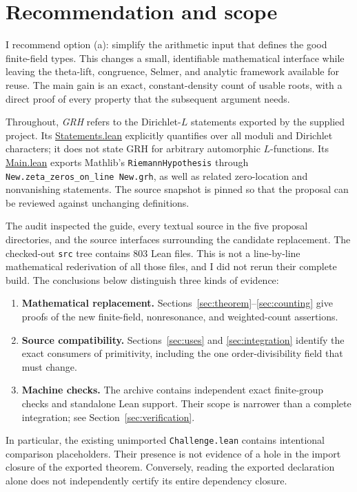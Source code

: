 \documentclass[11pt,a4paper]{article}
\theoremstyle{definition}
\theoremstyle{remark}
\newcommand{\code}[1]{{\small\nolinkurl{#1}}}
\newcommand{\src}[2]{\href{https://github.com/VladimirReshetnikov/ProveIt/blob/89d12dd40424f1217fd818d84877b3da52396a3b/Analysis/GeneralizedRiemannHypothesis/Lean/grh/src/#1.lean}{#2}}
\begin{document}
\section{Recommendation and scope}

I recommend option (a): simplify the arithmetic input that defines the good finite-field
types. This changes a small, identifiable mathematical interface while leaving the
theta-lift, congruence, Selmer, and analytic framework available for reuse.
The main gain is an exact, constant-density count of usable roots, with a direct proof of
every property that the subsequent argument needs.

Throughout, \emph{GRH} refers to the Dirichlet-\(L\) statements exported by the supplied
project. Its \src{Statements}{Statements.lean} explicitly quantifies over all moduli and
Dirichlet characters; it does not state GRH for arbitrary automorphic \(L\)-functions.
Its \src{Main}{Main.lean} exports Mathlib's \code{RiemannHypothesis} through
\code{New.zeta_zeros_on_line New.grh}, as well as related zero-location and nonvanishing
statements. The source snapshot is pinned so that the proposal can be reviewed against
unchanging definitions.

The audit inspected the guide, every textual source in the five proposal directories,
and the source interfaces surrounding the candidate replacement. The checked-out
\code{src} tree contains 803 Lean files. This is not a line-by-line mathematical
rederivation of all those files, and I did not rerun their complete build.
The conclusions below distinguish three kinds of evidence:

\begin{enumerate}
\item \textbf{Mathematical replacement.} Sections~\ref{sec:theorem}--\ref{sec:counting}
give proofs of the new finite-field, nonresonance, and weighted-count assertions.
\item \textbf{Source compatibility.} Sections~\ref{sec:uses} and \ref{sec:integration}
identify the exact consumers of primitivity, including the one order-divisibility
field that must change.
\item \textbf{Machine checks.} The archive contains independent exact finite-group
checks and standalone Lean support. Their scope is narrower than a complete
integration; see Section~\ref{sec:verification}.
\end{enumerate}

In particular, the existing unimported \code{Challenge.lean} contains intentional
comparison placeholders. Their presence is not evidence of a hole in the import
closure of the exported theorem. Conversely, reading the exported declaration alone
does not independently certify its entire dependency closure.
\end{document}
